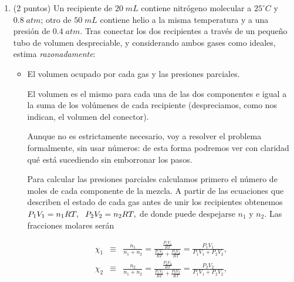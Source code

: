 \documentclass[a4paper,14pt]{extarticle}
\newcommand\ddfrac[2]{\frac{\displaystyle #1}{\displaystyle #2}}
\begin{document}
\begin{enumerate}
    \item (2 puntos) Un recipiente de $20\;mL$ contiene nitrógeno molecular a $25^\circ C$ y $0.8\;atm$; otro de $50\;mL$ contiene helio a la misma temperatura y a una presión de $0.4\;atm$. Tras conectar los dos recipientes a través de un pequeño tubo de volumen despreciable, y considerando ambos gases como ideales, estima \textit{razonadamente}:
    	\begin{itemize}
    		\item[a)] El volumen ocupado por cada gas y las presiones parciales.
    		\begin{mdframed}[backgroundcolor=brown!10]  
    		El volumen es el mismo para cada una de las dos componentes e igual a la suma de los volúmenes de cada recipiente (despreciamos, como nos indican, el volumen del conector). 
    		\vspace{1ex}
    		
    		Aunque no es estrictamente necesario, voy a resolver el problema formalmente, sin usar números: de esta forma podremos ver con claridad qué está sucediendo sin emborronar los pasos.
    		\vspace{1ex}
    		
    		Para calcular las presiones parciales calculamos primero el número de moles de cada componente de la mezcla. A partir de las ecuaciones que describen el estado de cada gas antes de unir los recipientes obtenemos
    		$P_1V_1=n_1RT,\hspace{1.5ex} P_2V_2=n_2RT,$
    		de donde puede despejarse $n_1$ y $n_2$.     		Las fracciones molares serán 
    		\vspace{-3ex}
    		
			\begin{eqnarray*}
				\chi_1&\equiv&\frac{n_1}{n_1+n_2}=\ddfrac{\frac{P_1V_1}{RT}}{\frac{P_1V_1}{RT}+\frac{P_2V_2}{RT}}=\frac{P_1V_1}{P_1V_1+P_2V_2},\\
				\chi_2&\equiv&\frac{n_2}{n_1+n_2}=\ddfrac{\frac{P_2V_2}{RT}}{\frac{P_1V_1}{RT}+\frac{P_2V_2}{RT}}=\frac{P_2V_2}{P_1V_1+P_2V_2},
			\end{eqnarray*}		
			\vspace{-1.5ex}
				    		

\end{mdframed}
\end{itemize}
\end{enumerate}
\end{document}
